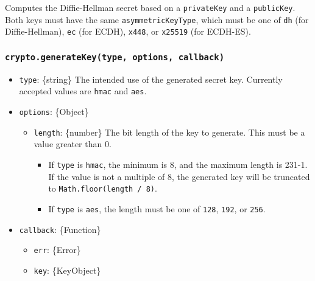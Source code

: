 Computes the Diffie-Hellman secret based on a \texttt{privateKey} and a
\texttt{publicKey}. Both keys must have the same
\texttt{asymmetricKeyType}, which must be one of
\texttt{\textquotesingle{}dh\textquotesingle{}} (for Diffie-Hellman),
\texttt{\textquotesingle{}ec\textquotesingle{}} (for ECDH),
\texttt{\textquotesingle{}x448\textquotesingle{}}, or
\texttt{\textquotesingle{}x25519\textquotesingle{}} (for ECDH-ES).

\subsubsection{\texorpdfstring{\texttt{crypto.generateKey(type,\ options,\ callback)}}{crypto.generateKey(type, options, callback)}}\label{crypto.generatekeytype-options-callback}

\begin{itemize}
\tightlist
\item
  \texttt{type}: \{string\} The intended use of the generated secret
  key. Currently accepted values are
  \texttt{\textquotesingle{}hmac\textquotesingle{}} and
  \texttt{\textquotesingle{}aes\textquotesingle{}}.
\item
  \texttt{options}: \{Object\}

  \begin{itemize}
  \tightlist
  \item
    \texttt{length}: \{number\} The bit length of the key to generate.
    This must be a value greater than 0.

    \begin{itemize}
    \tightlist
    \item
      If \texttt{type} is
      \texttt{\textquotesingle{}hmac\textquotesingle{}}, the minimum is
      8, and the maximum length is 231-1. If the value is not a multiple
      of 8, the generated key will be truncated to
      \texttt{Math.floor(length\ /\ 8)}.
    \item
      If \texttt{type} is
      \texttt{\textquotesingle{}aes\textquotesingle{}}, the length must
      be one of \texttt{128}, \texttt{192}, or \texttt{256}.
    \end{itemize}
  \end{itemize}
\item
  \texttt{callback}: \{Function\}

  \begin{itemize}
  \tightlist
  \item
    \texttt{err}: \{Error\}
  \item
    \texttt{key}: \{KeyObject\}
  \end{itemize}
\end{itemize}

